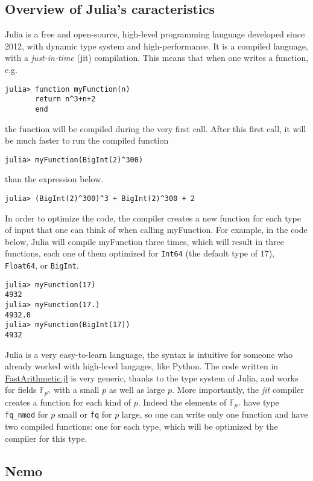 \documentclass[a4paper,11pt]{article}
\theoremstyle{break}
\theoremstyle{definition}
\theoremstyle{remark}
\begin{document}
\subsection{Overview of Julia's caracteristics}
Julia is a free and open-source, high-level programming language developed since 
2012, with dynamic
type system and high-performance. It is a compiled language, with a
\emph{just-in-time} (jit) compilation. This means that when one writes a
function, e.g. 
\begin{verbatim}
julia> function myFunction(n)
       return n^3+n+2
       end
\end{verbatim}
the function will be compiled during the very first call. After this first
call, it will be much faster to run the compiled function
\begin{verbatim}
julia> myFunction(BigInt(2)^300)
\end{verbatim}
than the expression below.
\begin{verbatim}
julia> (BigInt(2)^300)^3 + BigInt(2)^300 + 2
\end{verbatim}
In order to optimize the code, the compiler creates a new function for each
type of input that one can think of when calling myFunction. For example, in the
code 
below, Julia will compile myFunction three times, which will result in
three functions, each one of them optimized for \texttt{Int64} (the default type
of $17$), \texttt{Float64}, or \texttt{BigInt}.
\begin{verbatim}
julia> myFunction(17)
4932
julia> myFunction(17.)
4932.0
julia> myFunction(BigInt(17))
4932
\end{verbatim}
Julia is a very easy-to-learn language, the syntax is intuitive for someone who
already worked with high-level langages, like Python.
The code written in \href{https://github.com/edouardRousseau/FastArithmetic.jl}{FastArithmetic.jl} is
very generic, thanks to the type system of Julia, and works for fields
$\mathbb{F}_{p^n}$ with a small $p$ as well as large $p$. More importantly, the
\emph{jit} compiler creates a function for each kind of $p$. Indeed the elements
of $\mathbb{F}_{p^n}$ have type \texttt{fq\_nmod} for $p$ small or \texttt{fq}
for $p$ large, so one can write only one function and have two compiled
functions: one for each type, which will be optimized by the compiler for this 
type.

\subsection{Nemo}
\end{document}
